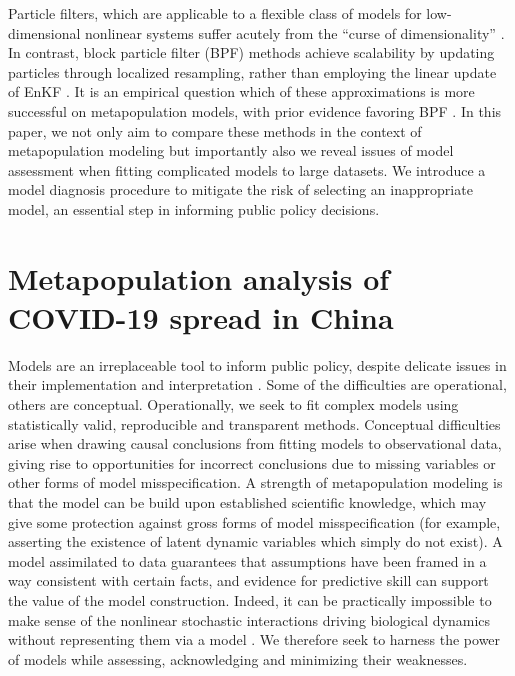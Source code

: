 \documentclass[12pt]{article}\usepackage[]{graphicx}\usepackage[]{xcolor}
\begin{document}
Particle filters, which are applicable to a flexible class of models for low-dimensional nonlinear systems \cite{breto09,king16} suffer acutely from the ``curse of dimensionality'' \cite{bengtsson08}.
In contrast, block particle filter (BPF) methods achieve scalability by updating particles through localized resampling, rather than employing the linear update of EnKF \cite{rebeschini15}.
It is an empirical question which of these approximations is more successful on metapopulation models,  with prior evidence favoring BPF \cite{ionides21}.
In this paper, we not only aim to compare these methods in the context of metapopulation modeling but importantly also we reveal issues of model assessment when fitting complicated models to large datasets.
We introduce a model diagnosis procedure to mitigate the risk of selecting an inappropriate model, an essential step in informing public policy decisions.


\section{Metapopulation analysis of COVID-19 spread in China}
\label{sec:covid}
Models are an irreplaceable tool to inform public policy, despite delicate issues in their implementation and interpretation \cite{mccabe21,saltelli20}.
Some of the difficulties are operational, others are conceptual.
Operationally, we seek to fit complex models using statistically valid, reproducible and transparent methods.
Conceptual difficulties arise when drawing causal conclusions from fitting models to observational data, giving rise to opportunities for incorrect conclusions due to missing variables or other forms of model misspecification.
A strength of metapopulation modeling is that the model can be build upon established scientific knowledge, which may give some protection against gross forms of model misspecification (for example, asserting the existence of latent dynamic variables which simply do not exist).
A model assimilated to data guarantees that assumptions have been framed in a way consistent with certain facts, and evidence for predictive skill can support the value of the model construction.
Indeed, it can be practically impossible to make sense of the nonlinear stochastic interactions driving biological dynamics without representing them via a model \cite{mccabe21,lofgren14}.
We therefore seek to harness the power of models while assessing, acknowledging and minimizing their weaknesses.
\end{document}
